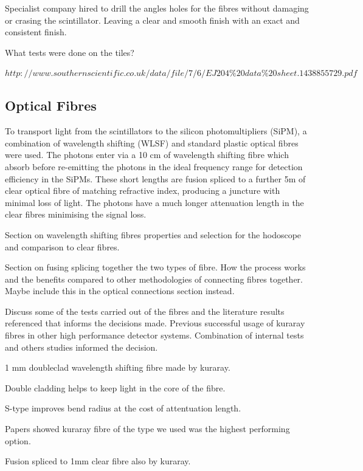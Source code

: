 Specialist company hired to drill the angles holes for the fibres without damaging or crasing the scintillator. Leaving a clear and smooth finish with an exact and consistent finish.

What tests were done on the tiles?


$http://www.southernscientific.co.uk/data/file/7/6/EJ204\%20data\%20sheet.1438855729.pdf$

\cite{jacosalem2007systematic}

\subsection{Optical Fibres}

To transport light from the scintillators to the silicon photomultipliers (SiPM), a combination of wavelength shifting (WLSF) and standard plastic optical fibres were used. The photons enter via a 10 cm of wavelength shifting fibre which absorb before re-emitting the photons in the ideal frequency range for detection efficiency in the SiPMs. These short lengths are fusion spliced to a further 5m of clear optical fibre of matching refractive index, producing a juncture with minimal loss of light. The photons have a much longer attenuation length in the clear fibres minimising the signal loss.

Section on wavelength shifting fibres properties and selection for the hodoscope and comparison to clear fibres.

Section on fusing splicing together the two types of fibre. How the process works and the benefits compared to other methodologies of connecting fibres together. Maybe include this in the optical connections section instead.

Discuss some of the tests carried out of the fibres and the literature results referenced that informs the decisions made. Previous successful usage of kuraray fibres in other high performance detector systems. Combination of internal tests and others studies informed the decision.


1 mm doubleclad wavelength shifting fibre made by kuraray.

Double cladding helps to keep light in the core of the fibre.

S-type improves bend radius at the cost of attentuation length.

Papers showed kuraray fibre of the type we used was the highest performing option.

Fusion spliced to 1mm clear fibre also by kuraray.


